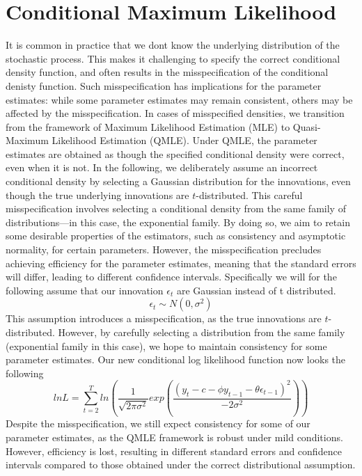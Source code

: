 \documentclass[a4paper,12pt]{article}
\begin{document}
\section{Conditional Maximum Likelihood}
It is common in practice that we dont know the underlying distribution of the stochastic process.
This makes it challenging to specify the correct conditional density function, and often results in the misspecification of the conditional denisty function.
Such misspecification has implications for the parameter estimates: while some parameter estimates may remain consistent, others may be affected by the misspecification.
In cases of misspecified densities, we transition from the framework of Maximum Likelihood Estimation (MLE) to Quasi-Maximum Likelihood Estimation (QMLE).
Under QMLE, the parameter estimates are obtained as though the specified conditional density were correct, even when it is not. 
In the following, we deliberately assume an incorrect conditional density by selecting a Gaussian distribution for the innovations, even though the true underlying innovations are \( t \)-distributed.
This careful misspecification involves selecting a conditional density from the same family of distributions—in this case, the exponential family.
By doing so, we aim to retain some desirable properties of the estimators, such as consistency and asymptotic normality, for certain parameters.
However, the misspecification precludes achieving efficiency for the parameter estimates, meaning that the standard errors will differ, leading to different confidence intervals.
Specifically we will for the following assume that our innovation $\epsilon_t$ are Gaussian instead of t distributed.
 \begin{equation}
     \epsilon_t \sim N(0,\sigma^2) 
 \end{equation}
This assumption introduces a misspecification, as the true innovations are \( t \)-distributed. However, by carefully selecting a distribution from the same family (exponential family in this case), we hope to maintain consistency for some parameter estimates. 
 Our new conditional log likelihood function now looks the following
 \begin{equation}
     ln L = \sum_{t=2}^{T} ln (\frac{1}{\sqrt{2\pi \sigma^2}} exp(\frac{(y_t -c -\phi y_{t-1} - \theta \epsilon_{t-1})^2}{-2 \sigma^2} ))
 \end{equation}
Despite the misspecification, we still expect consistency for some of our parameter estimates, as the QMLE framework is robust under mild conditions. However, efficiency is lost, resulting in different standard errors and confidence intervals compared to those obtained under the correct distributional assumption.
\end{document}
